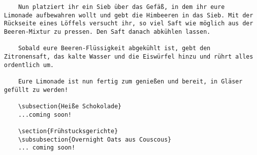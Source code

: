 \begin{verbatim}
	Nun platziert ihr ein Sieb über das Gefäß, in dem ihr eure Limonade aufbewahren wollt und gebt die Himbeeren in das Sieb. Mit der Rückseite eines Löffels versucht ihr, so viel Saft wie möglich aus der Beeren-Mixtur zu pressen. Den Saft danach abkühlen lassen.
	
	Sobald eure Beeren-Flüssigkeit abgekühlt ist, gebt den Zitronensaft, das kalte Wasser und die Eiswürfel hinzu und rührt alles ordentlich um.
	
	Eure Limonade ist nun fertig zum genießen und bereit, in Gläser gefüllt zu werden!
	
	\subsection{Heiße Schokolade}
	...coming soon!
	
	\section{Frühstucksgerichte}
	\subsubsection{Overnight Oats aus Couscous}
	... coming soon!
	
	
\end{verbatim}